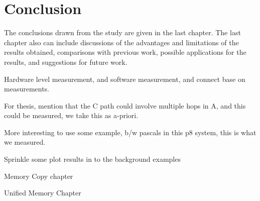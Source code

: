 \chapter{Conclusion}
\label{ch:conclusion}

The conclusions drawn from the study are given in the last chapter.
The last chapter also can include discussions of the advantages and limitations of the results obtained, comparisons with previous work, possible applications for the results, and suggestions for future work.



Hardware level measurement, and software measurement, and connect base on measurements.

For thesis, mention that the C path could involve multiple hops in A, and this could be measured, we take this as a-priori.

More interesting to use some example, b/w pascals in this p8 system, this is what we measured.

Sprinkle some plot results in to the background examples

Memory Copy chapter

Unified Memory Chapter
